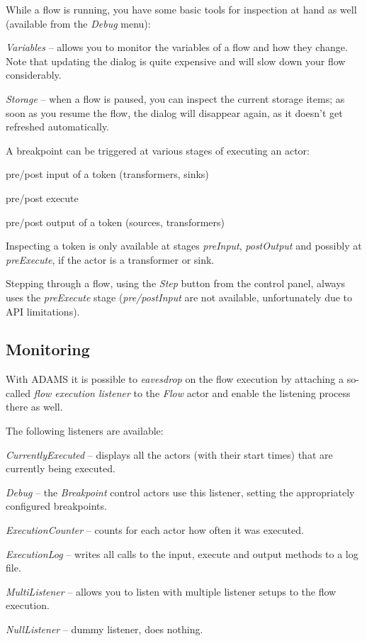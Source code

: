 While a flow is running, you have some basic tools for inspection at hand as 
well (available from the \textit{Debug} menu):
\begin{tight_itemize}
	\item \textit{Variables} -- allows you to monitor the variables of a flow
	and how they change. Note that updating the dialog is quite expensive and
	will slow down your flow considerably.
	\item \textit{Storage} -- when a flow is paused, you can inspect the 
	current storage items; as soon as you resume the flow, the dialog will 
	disappear again, as it doesn't get refreshed automatically.
\end{tight_itemize}
A breakpoint can be triggered at various stages of executing an actor:
\begin{tight_itemize}
  \item pre/post input of a token (transformers, sinks)
  \item pre/post execute
  \item pre/post output of a token (sources, transformers)
\end{tight_itemize}
Inspecting a token is only available at stages \textit{preInput},
\textit{postOutput} and possibly at \textit{preExecute}, if the
actor is a transformer or sink.

Stepping through a flow, using the \textit{Step} button from the control
panel, always uses the \textit{preExecute} stage (\textit{pre/postInput}
are not available, unfortunately due to API limitations).

\subsection{Monitoring}
With ADAMS it is possible to \textit{eavesdrop} on the flow execution by 
attaching a so-called \textit{flow execution listener} to the \textit{Flow}
actor and enable the listening process there as well.

The following listeners are available:
\begin{tight_itemize}
	\item \textit{CurrentlyExecuted} -- displays all the actors (with their 
	start times) that are currently being executed.
	\item \textit{Debug} -- the \textit{Breakpoint} control actors use
	this listener, setting the appropriately configured breakpoints.
	\item \textit{ExecutionCounter} -- counts for each actor how often it was
	executed.
	\item \textit{ExecutionLog} -- writes all calls to the input, execute 
	and output methods to a log file.
	\item \textit{MultiListener} -- allows you to listen with multiple 
	listener setups to the flow execution.
	\item \textit{NullListener} -- dummy listener, does nothing.
\end{tight_itemize}


